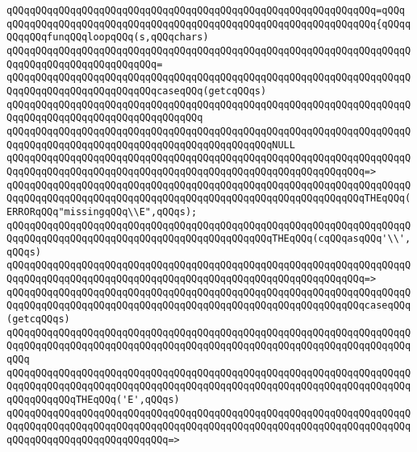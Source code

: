 \verb|qQQqqQQqqQQqqQQqqQQqqQQqqQQqqQQqqQQqqQQqqQQqqQQqqQQqqQQqqQQqqQQq=qQQq|\newline
\verb|qQQqqQQqqQQqqQQqqQQqqQQqqQQqqQQqqQQqqQQqqQQqqQQqqQQqqQQqqQQqqQQq{qQQqqQQqqQQqfunqQQqloopqQQq(s,qQQqchars)|\newline
\verb|qQQqqQQqqQQqqQQqqQQqqQQqqQQqqQQqqQQqqQQqqQQqqQQqqQQqqQQqqQQqqQQqqQQqqQQqqQQqqQQqqQQqqQQqqQQqqQQq=|\newline
\verb|qQQqqQQqqQQqqQQqqQQqqQQqqQQqqQQqqQQqqQQqqQQqqQQqqQQqqQQqqQQqqQQqqQQqqQQqqQQqqQQqqQQqqQQqqQQqqQQqcaseqQQq(getcqQQqs)|\newline
\verb|qQQqqQQqqQQqqQQqqQQqqQQqqQQqqQQqqQQqqQQqqQQqqQQqqQQqqQQqqQQqqQQqqQQqqQQqqQQqqQQqqQQqqQQqqQQqqQQqqQQqqQQq|\newline
\verb|qQQqqQQqqQQqqQQqqQQqqQQqqQQqqQQqqQQqqQQqqQQqqQQqqQQqqQQqqQQqqQQqqQQqqQQqqQQqqQQqqQQqqQQqqQQqqQQqqQQqqQQqqQQqqQQqqQQqNULL|\newline
\verb|qQQqqQQqqQQqqQQqqQQqqQQqqQQqqQQqqQQqqQQqqQQqqQQqqQQqqQQqqQQqqQQqqQQqqQQqqQQqqQQqqQQqqQQqqQQqqQQqqQQqqQQqqQQqqQQqqQQqqQQqqQQqqQQqqQQq=>|\newline
\verb|qQQqqQQqqQQqqQQqqQQqqQQqqQQqqQQqqQQqqQQqqQQqqQQqqQQqqQQqqQQqqQQqqQQqqQQqqQQqqQQqqQQqqQQqqQQqqQQqqQQqqQQqqQQqqQQqqQQqqQQqqQQqqQQqqQQqTHEqQQq(ERRORqQQq"missingqQQq\\E",qQQqs);|\newline
\newline
\verb|qQQqqQQqqQQqqQQqqQQqqQQqqQQqqQQqqQQqqQQqqQQqqQQqqQQqqQQqqQQqqQQqqQQqqQQqqQQqqQQqqQQqqQQqqQQqqQQqqQQqqQQqqQQqqQQqqQQqTHEqQQq(cqQQqasqQQq'\\',qQQqs)|\newline
\verb|qQQqqQQqqQQqqQQqqQQqqQQqqQQqqQQqqQQqqQQqqQQqqQQqqQQqqQQqqQQqqQQqqQQqqQQqqQQqqQQqqQQqqQQqqQQqqQQqqQQqqQQqqQQqqQQqqQQqqQQqqQQqqQQqqQQq=>|\newline
\verb|qQQqqQQqqQQqqQQqqQQqqQQqqQQqqQQqqQQqqQQqqQQqqQQqqQQqqQQqqQQqqQQqqQQqqQQqqQQqqQQqqQQqqQQqqQQqqQQqqQQqqQQqqQQqqQQqqQQqqQQqqQQqqQQqqQQqcaseqQQq(getcqQQqs)|\newline
\verb|qQQqqQQqqQQqqQQqqQQqqQQqqQQqqQQqqQQqqQQqqQQqqQQqqQQqqQQqqQQqqQQqqQQqqQQqqQQqqQQqqQQqqQQqqQQqqQQqqQQqqQQqqQQqqQQqqQQqqQQqqQQqqQQqqQQqqQQqqQQqqQQq|\newline
\verb|qQQqqQQqqQQqqQQqqQQqqQQqqQQqqQQqqQQqqQQqqQQqqQQqqQQqqQQqqQQqqQQqqQQqqQQqqQQqqQQqqQQqqQQqqQQqqQQqqQQqqQQqqQQqqQQqqQQqqQQqqQQqqQQqqQQqqQQqqQQqqQQqqQQqqQQqTHEqQQq('E',qQQqs)|\newline
\verb|qQQqqQQqqQQqqQQqqQQqqQQqqQQqqQQqqQQqqQQqqQQqqQQqqQQqqQQqqQQqqQQqqQQqqQQqqQQqqQQqqQQqqQQqqQQqqQQqqQQqqQQqqQQqqQQqqQQqqQQqqQQqqQQqqQQqqQQqqQQqqQQqqQQqqQQqqQQqqQQqqQQqqQQq=>|\newline
